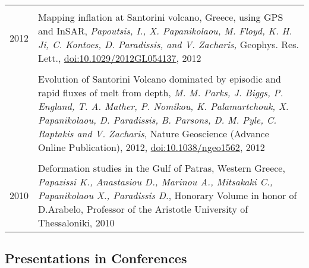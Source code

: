 \documentclass[9pt]{extarticle} %
\begin{document}
\begin{longtable}{r|p{14cm}}
%
\multicolumn{2}{c}{} \\ 
  \textsc{2012}
  & Mapping inflation at Santorini volcano, Greece, using GPS and InSAR,
  \emph{Papoutsis, I., X. Papanikolaou, M. Floyd, K. H. Ji, C. Kontoes, D. Paradissis, and V. Zacharis,}
  Geophys. Res. Lett., \href{http://www.agu.org/pubs/crossref/pip/2012GL054137.shtml}{doi:10.1029/2012GL054137}, 2012\\
%
  &\\
%
  & Evolution of Santorini Volcano dominated by episodic and rapid fluxes of melt from depth,
  \emph{M. M. Parks, J. Biggs, P. England, T. A. Mather, P. Nomikou, K. Palamartchouk, X. Papanikolaou, D. Paradissis, B. Parsons, D. M. Pyle, C. Raptakis and V. Zacharis},
  Nature Geoscience (Advance Online Publication), 2012, \href{http://www.nature.com/ngeo/journal/v5/n10/full/ngeo1562.html}{doi:10.1038/ngeo1562}, 2012\\
%
\multicolumn{2}{c}{} \\ 
  \textsc{2010}
  & Deformation studies in the Gulf of Patras, Western Greece,
  \emph{Papazissi K., Anastasiou D., Marinou A., Mitsakaki C., Papanikolaou X., Paradissis D.}, 
  Honorary Volume in honor of D.Arabelo, Professor of the Aristotle University of Thessaloniki, 2010\\
\end{longtable}
%

\subsection*{Presentations in Conferences}
\end{document}
